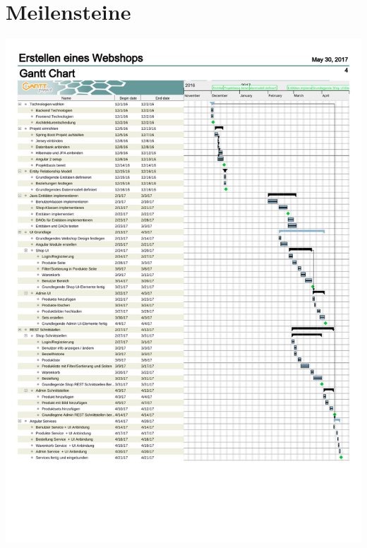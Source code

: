 	\section{Meilensteine}\label{appendix:milestones_ap}
	\vspace{-20pt}
	\centering
	\includegraphics[scale=0.8]{anhang/meilensteine.pdf}
	